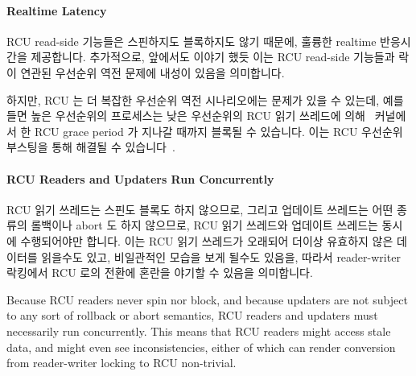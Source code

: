 \paragraph{Realtime Latency}

RCU read-side 기능들은 스핀하지도 블록하지도 않기 때문에, 훌륭한 realtime
반응시간을 제공합니다.
추가적으로, 앞에서도 이야기 했듯 이는 RCU read-side 기능들과 락이 연관된
우선순위 역전 문제에 내성이 있음을 의미합니다.

하지만, RCU 는 더 복잡한 우선순위 역전 시나리오에는 문제가 있을 수 있는데, 예를
들면 높은 우선순위의 프로세스는 낮은 우선순위의 RCU 읽기 쓰레드에 의해 \rt\
커널에서 한 RCU grace period 가 지나갈 때까지 블록될 수 있습니다.
이는 RCU 우선순위 부스팅을 통해 해결될 수
있습니다~\cite{PaulEMcKenney2007BoostRCU,DinakarGuniguntala2008IBMSysJ}.

\paragraph{RCU Readers and Updaters Run Concurrently}

RCU 읽기 쓰레드는 스핀도 블록도 하지 않으므로, 그리고 업데이트 쓰레드는 어떤
종류의 롤백이나 abort 도 하지 않으므로, RCU 읽기 쓰레드와 업데이트 쓰레드는
동시에 수행되어야만 합니다.
이는 RCU 읽기 쓰레드가 오래되어 더이상 유효하지 않은 데이터를 읽을수도 있고,
비일관적인 모습을 보게 될수도 있음을, 따라서 reader-writer 락킹에서 RCU 로의
전환에 혼란을 야기할 수 있음을 의미합니다.

\iffalse

Because RCU readers never spin nor block, and because updaters are not
subject to any sort of rollback or abort semantics, RCU readers and
updaters must necessarily run concurrently.
This means that RCU readers might access stale data, and might even
see inconsistencies, either of which can render conversion from reader-writer
locking to RCU non-trivial.


